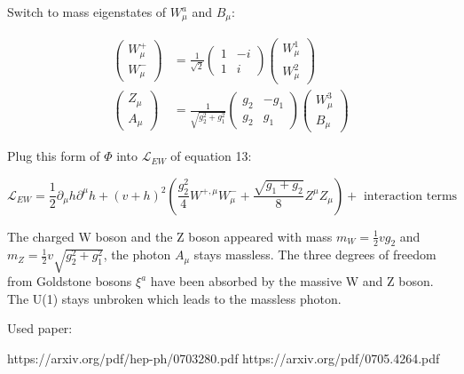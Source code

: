 \documentclass[12pt,oneside]{book}
\begin{document}
Switch to mass eigenstates of $W^{a}_\mu$ and $B_\mu$:

\begin{align}
    \begin{pmatrix} W^+_\mu \\ W^-_\mu \end{pmatrix} &= \frac{1}{\sqrt{2}} \begin{pmatrix} 1 & -i \\ 1 & i \end{pmatrix} \begin{pmatrix}  W^1_\mu\\ W^2_\mu \end{pmatrix} \\
    \begin{pmatrix} Z_\mu \\ A_\mu \end{pmatrix} &= \frac{1}{\sqrt{g_2^2+g_1^2}} \begin{pmatrix} g_2 & - g_1 \\ g_2 & g_1 \end{pmatrix} \begin{pmatrix}  W^3_\mu\\ B_\mu \end{pmatrix}
\end{align}

Plug this form of $\Phi$ into $\mathcal{L}_{EW}$ of equation 13:

\begin{equation}
    \mathcal{L}_{EW} = \frac{1}{2} \partial_\mu h\partial^{\mu} h + (v + h)^2 (\frac{g_2^2}{4}W^{+, \mu}W^{-}_\mu + \frac{\sqrt{g_1+g_2}}{8}Z^\mu Z_\mu) + \text{ interaction terms}
\end{equation} 

The charged W boson and the Z boson appeared with mass $m_W = \frac{1}{2}vg_2$ and $m_Z = \frac{1}{2}v\sqrt{g_2^2+g_1^2}$, the photon $A_\mu$ stays massless. The three degrees of freedom from Goldstone bosons $\xi^{a}$ have been absorbed by the massive W and Z boson. The U(1) stays unbroken which leads to the massless photon.  \newline 

Used paper: \newline

https://arxiv.org/pdf/hep-ph/0703280.pdf \newline
https://arxiv.org/pdf/0705.4264.pdf
\end{document}
